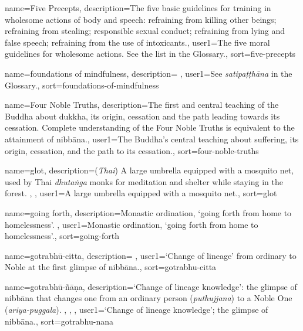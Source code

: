 {
name={Five Precepts},
description={The five basic guidelines for training in wholesome actions of body and speech: refraining from killing other beings; refraining from stealing; responsible sexual conduct; refraining from lying and false speech; refraining from the use of intoxicants.},
user1={The five moral guidelines for wholesome actions. See the list in the Glossary.},
sort={five-precepts}
}

{
name={foundations of mindfulness},
description={\nopostdesc \protect \seepre %
\protect {}%
\protect \seepost %
},
user1={See \textit{satipa\d{t}\d{t}h\=ana} in the Glossary.},
sort={foundations-of-mindfulness}
}

{
name={Four Noble Truths},
description={The first and central teaching of the Buddha about dukkha, its origin, cessation and the path leading towards its cessation. Complete understanding of the Four Noble Truths is equivalent to the attainment of nibb\=ana.},
user1={The Buddha's central teaching about suffering, its origin, cessation, and the path to its cessation.},
sort={four-noble-truths}
}

{
name=glot,
description={(\textit{Thai}) A large umbrella equipped with a mosquito net, used by Thai \textit{dhuta\.nga} monks for meditation and shelter while staying in the forest. \protect \seepre %
\protect {}, \protect {}%
\protect \seepost %
},
user1={A large umbrella equipped with a mosquito net.},
sort={glot}
}

{
name={going forth},
description={Monastic ordination, `going forth from home to homelessness'. \protect \seepre %
\protect {}%
\protect \seepost %
},
user1={Monastic ordination, `going forth from home to homelessness'.},
sort={going-forth}
}

{
name={gotrabh\=u-citta},
description={\nopostdesc \protect \seepre %
\protect {}%
\protect \seepost %
},
user1={`Change of lineage' from ordinary to Noble at the first glimpse of nibb\=ana.},
sort={gotrabhu-citta}
}

{
name={gotrabh\=u-\~n\=a\d{n}a},
description={`Change of lineage knowledge': the glimpse of nibb\=ana that changes one from an ordinary person (\textit{puthujjana}) to a Noble One (\textit{ariya-puggala}). \protect \seepre %
\protect {}, \protect {}, \protect {}%
\protect \seepost %
},
user1={`Change of lineage knowledge'; the glimpse of nibb\=ana.},
sort={gotrabhu-nana}
}

